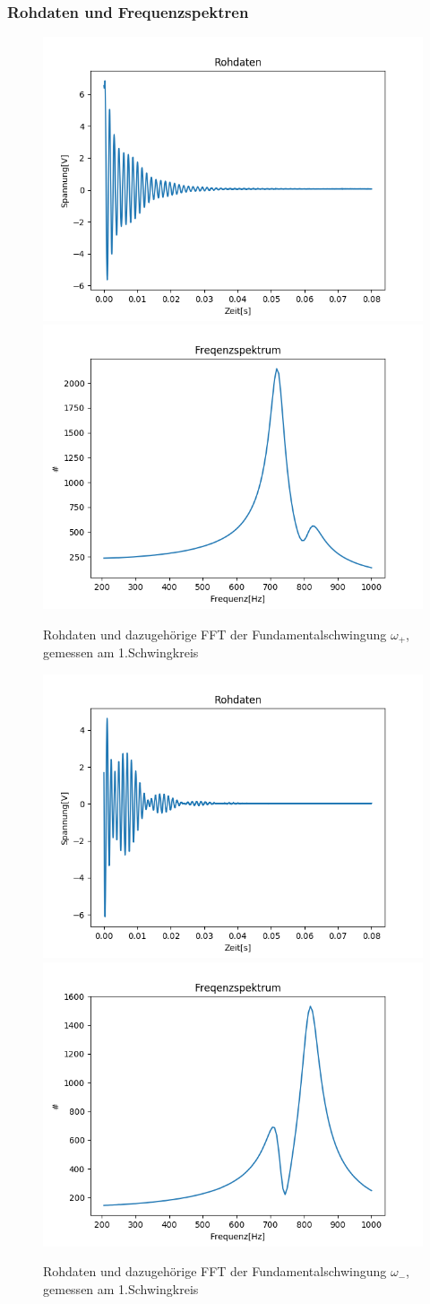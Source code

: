\documentclass[12pt,a4paper]{article}
\begin{document}
\subsubsection{Rohdaten und Frequenzspektren}
\begin{figure}
\begin{center}
\includegraphics[width=0.49\linewidth]{Bilder/Fund_Rohdaten1.PNG}
\includegraphics[width=0.49\linewidth]{Bilder/Fund_Frequenz1.PNG}
\end{center}
\caption[Aufbau Schwebung]{Rohdaten und dazugehörige FFT der Fundamentalschwingung $\omega_+$, gemessen am 1.Schwingkreis}
\label{fig:Fund_Roh1}
\end{figure}

\begin{figure}
\begin{center}
\includegraphics[width=0.49\linewidth]{Bilder/Fund_Rohdaten2.PNG}
\includegraphics[width=0.49\linewidth]{Bilder/Fund_Frequenz2.PNG}
\end{center}
\caption[Aufbau Schwebung]{Rohdaten und dazugehörige FFT der Fundamentalschwingung $\omega_-$, gemessen am 1.Schwingkreis}
\label{fig:Fund_Roh2}
\end{figure}
\end{document}

